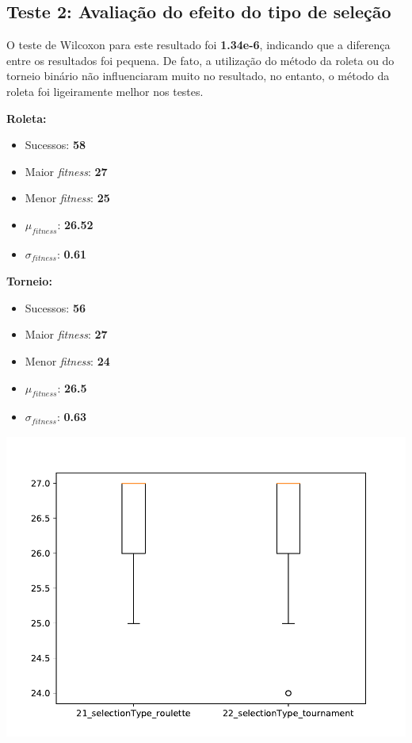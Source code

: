 \documentclass[11pt,a4paper]{article}
\begin{document}
\subsection{Teste 2: Avaliação do efeito do tipo de seleção}
O teste de Wilcoxon para este resultado foi \textbf{1.34e-6}, indicando que a diferença entre os resultados foi pequena. De fato, a utilização do método da roleta ou do torneio binário não influenciaram muito no resultado, no entanto, o método da roleta foi ligeiramente melhor nos testes.\\

\begin{minipage}{0.25\linewidth}
\textbf{Roleta:}
\begin{itemize}
	\footnotesize
	\setlength\itemsep{0em}
	\item Sucessos: \textbf{58}
	\item Maior \textit{fitness}: \textbf{27}
	\item Menor \textit{fitness}: \textbf{25}
	\item $\mu_{\textit{fitness}}$: \textbf{26.52}
	\item $\sigma_{\textit{fitness}}$: \textbf{0.61}
\end{itemize}
\end{minipage}
\begin{minipage}{0.25\linewidth}
\textbf{Torneio:}
\begin{itemize}
	\footnotesize
	\setlength\itemsep{0em}
	\item Sucessos: \textbf{56}
	\item Maior \textit{fitness}: \textbf{27}
	\item Menor \textit{fitness}: \textbf{24}
	\item $\mu_{\textit{fitness}}$: \textbf{26.5}
	\item $\sigma_{\textit{fitness}}$: \textbf{0.63}
\end{itemize}
\end{minipage}
\begin{minipage}{0.4\linewidth}
\includegraphics[scale=0.5]{teste2.pdf} 
\end{minipage}
\end{document}
